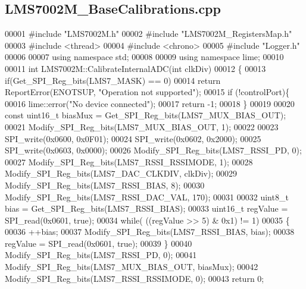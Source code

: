 \subsection{L\+M\+S7002\+M\+\_\+\+Base\+Calibrations.\+cpp}
\label{LMS7002M__BaseCalibrations_8cpp_source}

\begin{DoxyCode}
00001 \textcolor{preprocessor}{#include "LMS7002M.h"}
00002 \textcolor{preprocessor}{#include "LMS7002M_RegistersMap.h"}
00003 \textcolor{preprocessor}{#include <thread>}
00004 \textcolor{preprocessor}{#include <chrono>}
00005 \textcolor{preprocessor}{#include "Logger.h"}
00006 
00007 \textcolor{keyword}{using namespace }std;
00008 
00009 \textcolor{keyword}{using namespace }lime;
00010 
00011 \textcolor{keywordtype}{int} LMS7002M::CalibrateInternalADC(\textcolor{keywordtype}{int} clkDiv)
00012 \{
00013     \textcolor{keywordflow}{if}(Get_SPI_Reg_bits(LMS7_MASK) == 0)
00014         \textcolor{keywordflow}{return} ReportError(ENOTSUP, \textcolor{stringliteral}{"Operation not supported"});
00015     \textcolor{keywordflow}{if} (!controlPort)\{
00016         lime::error(\textcolor{stringliteral}{"No device connected"});
00017         \textcolor{keywordflow}{return} -1;
00018     \}
00019 
00020     \textcolor{keyword}{const} uint16\_t biasMux = Get_SPI_Reg_bits(LMS7_MUX_BIAS_OUT);
00021     Modify_SPI_Reg_bits(LMS7_MUX_BIAS_OUT, 1);
00022 
00023     SPI_write(0x0600, 0x0F01);
00024     SPI_write(0x0602, 0x2000);
00025     SPI_write(0x0603, 0x0000);
00026     Modify_SPI_Reg_bits(LMS7_RSSI_PD, 0);
00027     Modify_SPI_Reg_bits(LMS7_RSSI_RSSIMODE, 1);
00028     Modify_SPI_Reg_bits(LMS7_DAC_CLKDIV, clkDiv);
00029     Modify_SPI_Reg_bits(LMS7_RSSI_BIAS, 8);
00030     Modify_SPI_Reg_bits(LMS7_RSSI_DAC_VAL, 170);
00031 
00032     uint8\_t bias = Get_SPI_Reg_bits(LMS7_RSSI_BIAS);
00033     uint16\_t regValue = SPI_read(0x0601, \textcolor{keyword}{true});
00034     \textcolor{keywordflow}{while}( ((regValue >> 5) & 0x1) != 1)
00035     \{
00036         ++bias;
00037         Modify_SPI_Reg_bits(LMS7_RSSI_BIAS, bias);
00038         regValue = SPI_read(0x0601, \textcolor{keyword}{true});
00039     \}
00040     Modify_SPI_Reg_bits(LMS7_RSSI_PD, 0);
00041     Modify_SPI_Reg_bits(LMS7_MUX_BIAS_OUT, biasMux);
00042     Modify_SPI_Reg_bits(LMS7_RSSI_RSSIMODE, 0);
00043     \textcolor{keywordflow}{return} 0;

\end{DoxyCode}

